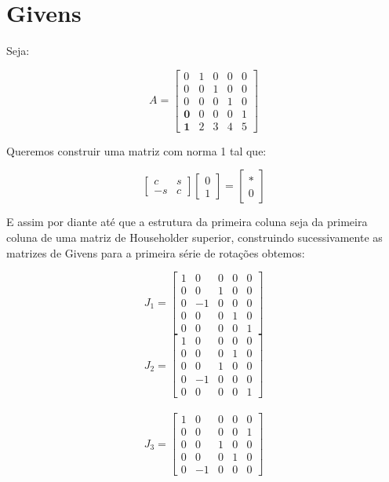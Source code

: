 \documentclass[11pt]{report}
\begin{document}
\section*{Givens}

Seja:

\[
A = \begin{bmatrix}
0 & 1 & 0 & 0 & 0 \\
0 & 0 & 1 & 0 & 0 \\
0 & 0 & 0 & 1 & 0 \\
\mathbf{0} & 0 & 0 & 0 & 1 \\
\mathbf{1} & 2 & 3 & 4 & 5 
\end{bmatrix}
\]

Queremos construir uma matriz com norma 1 tal que:

\[
\begin{bmatrix}
c & s \\
-s & c
\end{bmatrix}
\begin{bmatrix}
0 \\ 1
\end{bmatrix}
=
\begin{bmatrix}
* \\
0
\end{bmatrix}
\]

E assim por diante até que a estrutura da primeira coluna seja da primeira coluna de uma matriz de Householder superior, construindo sucessivamente as matrizes de Givens para a primeira série de rotações obtemos:

\[
J_1 = \begin{bmatrix}
1 & 0 & 0 & 0 & 0 \\
0 & 0 & 1 & 0 & 0 \\
0 & -1 & 0 & 0 & 0 \\
0 & 0 & 0 & 1 & 0 \\
0 & 0 & 0 & 0 & 1 
\end{bmatrix}
\]
\[
J_2 = \begin{bmatrix}
1 & 0 & 0 & 0 & 0 \\
0 & 0 & 0 & 1 & 0 \\
0 & 0 & 1 & 0 & 0 \\
0 & -1 & 0 & 0 & 0 \\
0 & 0 & 0 & 0 & 1 
\end{bmatrix}
\]\\
\[
J_3= \begin{bmatrix}
1 & 0 & 0 & 0 & 0 \\
0 & 0 & 0 & 0 & 1 \\
0 & 0 & 1 & 0 & 0 \\
0 & 0 & 0 & 1 & 0 \\
0 &-1 & 0 & 0 & 0 
\end{bmatrix}
\]
\end{document}

